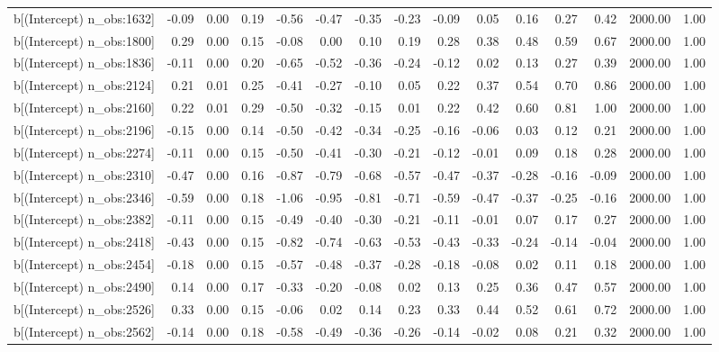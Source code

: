 \begin{table}[ht]
\begin{tabular}{rrrrrrrrrrrrrrr}
  b[(Intercept) n\_obs:1632] & -0.09 & 0.00 & 0.19 & -0.56 & -0.47 & -0.35 & -0.23 & -0.09 & 0.05 & 0.16 & 0.27 & 0.42 & 2000.00 & 1.00 \\ 
  b[(Intercept) n\_obs:1800] & 0.29 & 0.00 & 0.15 & -0.08 & 0.00 & 0.10 & 0.19 & 0.28 & 0.38 & 0.48 & 0.59 & 0.67 & 2000.00 & 1.00 \\ 
  b[(Intercept) n\_obs:1836] & -0.11 & 0.00 & 0.20 & -0.65 & -0.52 & -0.36 & -0.24 & -0.12 & 0.02 & 0.13 & 0.27 & 0.39 & 2000.00 & 1.00 \\ 
  b[(Intercept) n\_obs:2124] & 0.21 & 0.01 & 0.25 & -0.41 & -0.27 & -0.10 & 0.05 & 0.22 & 0.37 & 0.54 & 0.70 & 0.86 & 2000.00 & 1.00 \\ 
  b[(Intercept) n\_obs:2160] & 0.22 & 0.01 & 0.29 & -0.50 & -0.32 & -0.15 & 0.01 & 0.22 & 0.42 & 0.60 & 0.81 & 1.00 & 2000.00 & 1.00 \\ 
  b[(Intercept) n\_obs:2196] & -0.15 & 0.00 & 0.14 & -0.50 & -0.42 & -0.34 & -0.25 & -0.16 & -0.06 & 0.03 & 0.12 & 0.21 & 2000.00 & 1.00 \\ 
  b[(Intercept) n\_obs:2274] & -0.11 & 0.00 & 0.15 & -0.50 & -0.41 & -0.30 & -0.21 & -0.12 & -0.01 & 0.09 & 0.18 & 0.28 & 2000.00 & 1.00 \\ 
  b[(Intercept) n\_obs:2310] & -0.47 & 0.00 & 0.16 & -0.87 & -0.79 & -0.68 & -0.57 & -0.47 & -0.37 & -0.28 & -0.16 & -0.09 & 2000.00 & 1.00 \\ 
  b[(Intercept) n\_obs:2346] & -0.59 & 0.00 & 0.18 & -1.06 & -0.95 & -0.81 & -0.71 & -0.59 & -0.47 & -0.37 & -0.25 & -0.16 & 2000.00 & 1.00 \\ 
  b[(Intercept) n\_obs:2382] & -0.11 & 0.00 & 0.15 & -0.49 & -0.40 & -0.30 & -0.21 & -0.11 & -0.01 & 0.07 & 0.17 & 0.27 & 2000.00 & 1.00 \\ 
  b[(Intercept) n\_obs:2418] & -0.43 & 0.00 & 0.15 & -0.82 & -0.74 & -0.63 & -0.53 & -0.43 & -0.33 & -0.24 & -0.14 & -0.04 & 2000.00 & 1.00 \\ 
  b[(Intercept) n\_obs:2454] & -0.18 & 0.00 & 0.15 & -0.57 & -0.48 & -0.37 & -0.28 & -0.18 & -0.08 & 0.02 & 0.11 & 0.18 & 2000.00 & 1.00 \\ 
  b[(Intercept) n\_obs:2490] & 0.14 & 0.00 & 0.17 & -0.33 & -0.20 & -0.08 & 0.02 & 0.13 & 0.25 & 0.36 & 0.47 & 0.57 & 2000.00 & 1.00 \\ 
  b[(Intercept) n\_obs:2526] & 0.33 & 0.00 & 0.15 & -0.06 & 0.02 & 0.14 & 0.23 & 0.33 & 0.44 & 0.52 & 0.61 & 0.72 & 2000.00 & 1.00 \\ 
  b[(Intercept) n\_obs:2562] & -0.14 & 0.00 & 0.18 & -0.58 & -0.49 & -0.36 & -0.26 & -0.14 & -0.02 & 0.08 & 0.21 & 0.32 & 2000.00 & 1.00 \\ 

\end{tabular}
\end{table}
